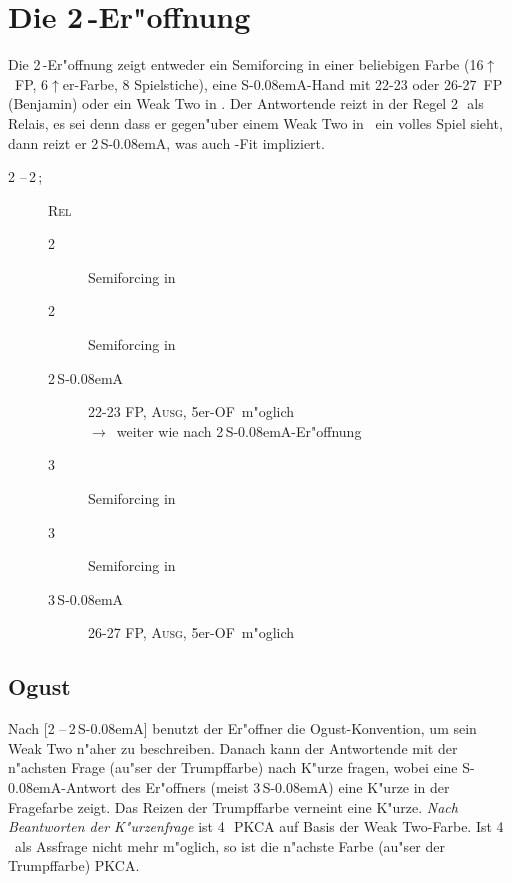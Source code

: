 \documentclass[11pt,german,twocolumn]{scrartcl}
\def\pik{\nobreak\,\Sp}
\def\coe{\nobreak\,\He}
\def\kar{\nobreak\,\Di}
\def\tre{\nobreak\,\Cl}
\def\ka{\Di}
\def\ra{$\rightarrow$}
\def\pl{$\uparrow$}
\def\ofa{\nobreak\textsf{OF}}
\def\sa{\nobreak\textsf{S\kern-0.08emA}}
\def\SA{\nobreak\,\sa}
\def\sep{\nobreak\,--\,}
\def\bal{\textsc{Ausg}}
\def\rel{\textsc{Rel}}
\def\bdsc{\begin{description}}
\def\edsc{\end{description}}
\newcommand{\Index}[1]{#1\index{#1}}
\begin{document}
\section{Die 2\tre-Er"offnung}

Die 2\tre-Er"offnung zeigt entweder ein Semiforcing in einer beliebigen Farbe
(16\pl\ FP, 6\pl er-Farbe, 8 Spielstiche),
eine \sa-Hand mit 22-23 oder 26-27~FP (Benjamin) oder ein \Index{Weak Two} in \ka. Der
Antwortende reizt in der Regel 2\kar\ als Relais, es sei denn dass er gegen"uber
einem Weak Two in \ka\ ein volles Spiel sieht, dann reizt er 2\SA, was auch
\ka-Fit impliziert.

\bdsc
\item[2\tre\sep2\kar;] \rel
  \bdsc
  \item[2\coe] Semiforcing in \coe
  \item[2\pik] Semiforcing in \pik
  \item[2\SA] 22-23 FP, \bal, 5er-\ofa\ m"oglich \\
    \ra\ weiter wie nach 2\SA-Er"offnung
  \item[3\tre] Semiforcing in \tre
  \item[3\kar] Semiforcing in \kar
  \item[3\SA] 26-27 FP, \bal, 5er-\ofa\ m"oglich
  \edsc
\edsc

\subsection{Ogust} \label{ogust}

Nach [2\tre\sep2\SA] benutzt der Er"offner die Ogust-Konvention, um sein Weak
Two n"aher zu beschreiben. Danach kann der Antwortende mit der n"achsten Frage
(au"ser der Trumpffarbe) nach K"urze fragen, wobei eine \sa-Antwort des
Er"offners (meist 3\SA) eine K"urze in der Fragefarbe zeigt. Das Reizen der
Trumpffarbe verneint eine K"urze. \emph{Nach Beantworten der K"urzenfrage} ist
4\tre\ PKCA auf Basis der Weak Two-Farbe. Ist 4\tre\ als Assfrage nicht mehr
m"oglich, so ist die n"achste Farbe (au"ser der Trumpffarbe) PKCA.
\end{document}
